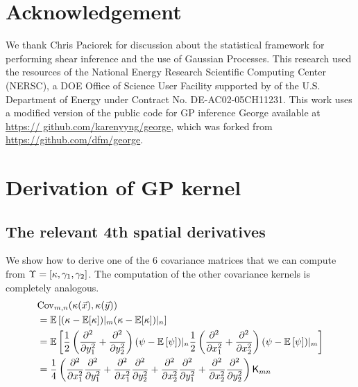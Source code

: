 

\section{Acknowledgement}
We thank Chris Paciorek for discussion about the statistical
framework for performing shear inference and the
use of Gaussian Processes.
This research
used the resources of the National Energy Research Scientific 
Computing Center (NERSC), a DOE Office of Science
User Facility supported by 
of the U.S. Department of Energy under Contract No.
DE-AC02-05CH11231.
 This work uses a modified version
of the public code for GP inference {\sc George} available at \href{https://
github.com/karenyyng/george}{https://
github.com/karenyyng/george}, which was forked from \\
\href{https://github.com/dfm/george}{https://github.com/dfm/george}.



\appendix 

\section{Derivation of GP kernel}
\label{app:GP_kernel_derivation}


\subsection{The relevant 4th spatial derivatives}
We show how to derive one of the 6  covariance matrices that we can compute
from $\Upsilon = [\kappa, \gamma_1, \gamma_2]$. The computation of the other
covariance kernels is completely analogous.
\begin{align*}
&{\rm Cov}_{m,n} (\kappa(\vec{x}), \kappa(\vec{y}))  \\ 
&= \mathbb{E} \left[ 
	(\kappa - \mathbb{E}[\kappa])|_m 
( \kappa - \mathbb{E}[\kappa])|_n\right] 
\\
 &=\mathbb{E}\left[
\frac{1}{2} \left(\frac{\partial^2}{\partial y_1^2} + 
\frac{\partial^2}{\partial y_2^2}\right) 
 (\psi - \mathbb{E}\left[\psi\right])|_n \frac{1}{2}
\left(\frac{\partial^2}{\partial x_1^2} + \frac{\partial^2}{\partial x_2^2} \right)
(\psi - \mathbb{E}\left[\psi\right])|_m \right]
\\
&= \frac{1}{4}\left(
\frac{\partial^2}{\partial x_1^2} \frac{\partial^2}{\partial y_1^2} + 
\frac{\partial^2}{\partial x_1^2} \frac{\partial^2}{\partial y_2^2} +  
\frac{\partial^2}{\partial x_2^2} \frac{\partial^2}{\partial y_1^2} + 
\frac{\partial^2}{\partial x_2^2} \frac{\partial^2}{\partial y_2^2}  
\right) \mathsf{K}_{mn}\\ 
\end{align*}


